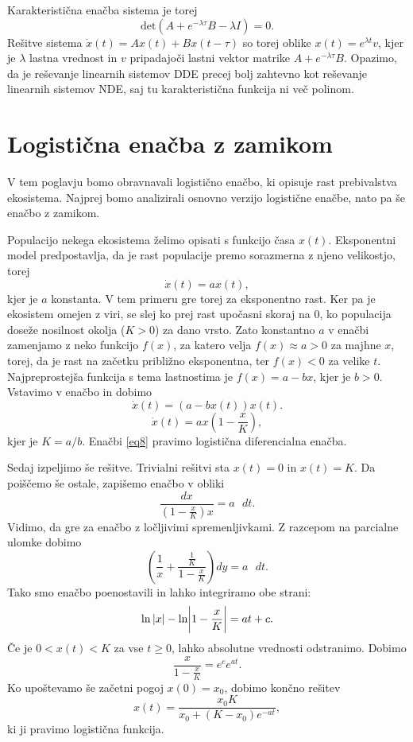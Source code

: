 \documentclass[12pt,a4paper]{amsart}
\theoremstyle{definition} %
\theoremstyle{plain} %
\begin{document}
Karakteristična enačba sistema je torej
\[\text{det}(A+e^{-\lambda\tau}B-\lambda I)=0.\]
Rešitve sistema $\dot{x}(t)=Ax(t)+Bx(t-\tau)$ so torej oblike $x(t)=e^{\lambda t}v$, kjer je $\lambda$ lastna vrednost in $v$ pripadajoči lastni 
vektor matrike $A+e^{-\lambda\tau}B$. Opazimo, da je reševanje linearnih sistemov DDE precej bolj zahtevno kot
reševanje linearnih sistemov NDE, saj tu karakteristična funkcija ni več polinom.

\section{Logistična enačba z zamikom}
V tem poglavju bomo obravnavali logistično enačbo, ki opisuje rast prebivalstva ekosistema. Najprej bomo analizirali 
osnovno verzijo logistične enačbe, nato pa še enačbo z zamikom.

Populacijo nekega ekosistema želimo opisati s funkcijo časa $x(t)$. Eksponentni model predpostavlja, da je rast 
populacije premo sorazmerna z njeno velikostjo, torej
\[\dot{x}(t)=ax(t), \]
kjer je $a$ konstanta. V tem primeru gre torej za eksponentno rast. Ker pa je ekosistem omejen z viri, se slej ko 
prej rast upočasni skoraj na 0, ko populacija doseže nosilnost okolja ($K>0$) za dano vrsto. Zato konstantno $a$ v 
enačbi zamenjamo z neko funkcijo $f(x)$, za katero velja $f(x)\approx a>0$ za majhne $x$, torej, da je rast na začetku 
približno eksponentna, ter $f(x)<0$ za velike $t$. Najpreprostejša funkcija s tema lastnostima je $f(x)=a-bx$, 
kjer je $b>0$. Vstavimo v enačbo in dobimo
\[\dot{x}(t)=(a-bx(t))x(t).\]
\begin{equation} \label{eq8}
    \dot{x}(t) = ax\left(1-\frac{x}{K}\right),
\end{equation}
kjer je $K=a/b$. Enačbi \eqref{eq8} pravimo logistična diferencialna enačba.

Sedaj izpeljimo še rešitve. Trivialni rešitvi sta $x(t)=0$ in $x(t)=K$. Da poiščemo še ostale, zapišemo enačbo v obliki
\[\frac{dx}{(1-\frac{x}{K})x}=a\text{ }dt.\]
Vidimo, da gre za enačbo z ločljivimi spremenljivkami. Z razcepom na parcialne ulomke dobimo
\[\left(\frac{1}{x}+\frac{\frac{1}{K}}{1-\frac{x}{K}}\right)dy=a\text{ }dt.\]
Tako smo enačbo poenostavili in lahko integriramo obe strani:
\[\ln|x|-\ln\biggr{|}1-\frac{x}{K}\biggr{|}=at+c.\]
Če je $0<x(t)<K$ za vse $t\geq0$, lahko absolutne vrednosti odstranimo. Dobimo 
\[\frac{x}{1-\frac{x}{K}}=e^ce^{at}.\]
Ko upoštevamo še začetni pogoj $x(0)=x_0$, dobimo končno rešitev
\[x(t)=\frac{x_0K}{x_0+(K-x_0)e^{-at}},\]
ki ji pravimo logistična funkcija.
\end{document}
